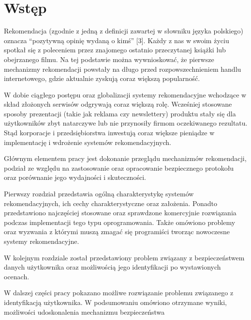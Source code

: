 
\chapter{Wstęp}

\indent Rekomendacja (zgodnie z jedną z definicji zawartej w słowniku języka polskiego) oznacza “pozytywną opinię wydaną o kimś” [3]. Każdy z nas w swoim życiu spotkał się z poleceniem przez znajomego ostatnio przeczytanej książki lub obejrzanego filmu. Na tej podstawie można wywnioskować, że pierwsze mechanizmy rekomendacji powstały na długo przed rozpowszechnieniem handlu internetowego, gdzie aktualnie zyskują coraz większą popularność.

\indent W dobie ciągłego postępu oraz globalizacji systemy rekomendacyjne wchodzące w skład złożonych serwisów odgrywają coraz większą rolę. Wcześniej stosowane sposoby prezentacji (takie jak reklama czy newslettery) produktu stały się dla użytkowników zbyt natarczywe lub nie przynosiły firmom oczekiwanego rezultatu. Stąd korporacje i przedsiębiorstwa inwestują coraz większe pieniądze w implementację i wdrożenie systemów rekomendacyjnych.

\indent Głównym elementem pracy jest dokonanie przeglądu mechanizmów rekomendacji, podział ze względu na zastosowanie oraz opracowanie bezpiecznego protokołu oraz porównanie jego wydajności i skuteczności.

\indent Pierwszy rozdział przedstawia ogólną charakterystykę systemów rekomendacyjnych, ich cechy charakterystyczne oraz założenia. Ponadto przedstawiono najczęściej stosowane oraz sprawdzone komercyjnie rozwiązania podczas implementacji tego typu oprogramowania. Także omówiono problemy oraz wyzwania z którymi muszą zmagać się programiści tworząc nowoczesne systemy rekomendacyjne.  

\indent W kolejnym rozdziale został przedstawiony problem związany z bezpieczeństwem danych użytkownika oraz możliwością jego identyfikacji po wystawionych ocenach.

\indent W dalszej części pracy pokazano możliwe rozwiązanie problemu związanego z identyfikacją użytkownika.
W podsumowaniu omówiono otrzymane wyniki, możliwości udoskonalenia mechanizmu bezpieczeństwa 


